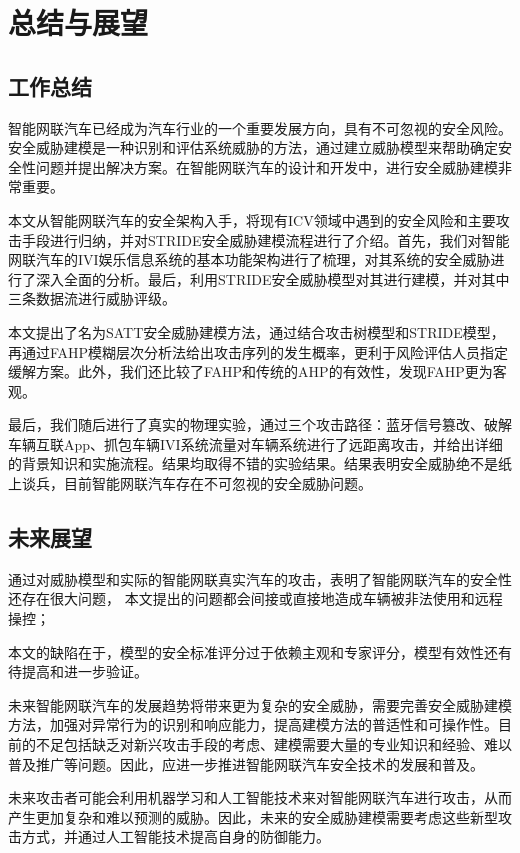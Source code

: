 \chapter{总结与展望}
\label{ch6}

\section{工作总结}
智能网联汽车已经成为汽车行业的一个重要发展方向，具有不可忽视的安全风险。安全威胁建模是一种识别和评估系统威胁的方法，通过建立威胁模型来帮助确定安全性问题并提出解决方案。在智能网联汽车的设计和开发中，进行安全威胁建模非常重要。

本文从智能网联汽车的安全架构入手，将现有ICV领域中遇到的安全风险和主要攻击手段进行归纳，并对STRIDE安全威胁建模流程进行了介绍。首先，我们对智能网联汽车的IVI娱乐信息系统的基本功能架构进行了梳理，对其系统的安全威胁进行了深入全面的分析。最后，利用STRIDE安全威胁模型对其进行建模，并对其中三条数据流进行威胁评级。

本文提出了名为SATT安全威胁建模方法，通过结合攻击树模型和STRIDE模型，再通过FAHP模糊层次分析法给出攻击序列的发生概率，更利于风险评估人员指定缓解方案。此外，我们还比较了FAHP和传统的AHP的有效性，发现FAHP更为客观。

最后，我们随后进行了真实的物理实验，通过三个攻击路径：蓝牙信号篡改、破解车辆互联App、抓包车辆IVI系统流量对车辆系统进行了远距离攻击，并给出详细的背景知识和实施流程。结果均取得不错的实验结果。结果表明安全威胁绝不是纸上谈兵，目前智能网联汽车存在不可忽视的安全威胁问题。

\section{未来展望}
通过对威胁模型和实际的智能网联真实汽车的攻击，表明了智能网联汽车的安全性还存在很大问题， 本文提出的问题都会间接或直接地造成车辆被非法使用和远程操控；

本文的缺陷在于，模型的安全标准评分过于依赖主观和专家评分，模型有效性还有待提高和进一步验证。

未来智能网联汽车的发展趋势将带来更为复杂的安全威胁，需要完善安全威胁建模方法，加强对异常行为的识别和响应能力，提高建模方法的普适性和可操作性。目前的不足包括缺乏对新兴攻击手段的考虑、建模需要大量的专业知识和经验、难以普及推广等问题。因此，应进一步推进智能网联汽车安全技术的发展和普及。

未来攻击者可能会利用机器学习和人工智能技术来对智能网联汽车进行攻击，从而产生更加复杂和难以预测的威胁。因此，未来的安全威胁建模需要考虑这些新型攻击方式，并通过人工智能技术提高自身的防御能力。